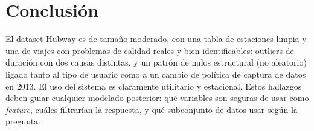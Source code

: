 \documentclass[11pt,a4paper]{article}
\begin{document}
\section*{Conclusión}

El dataset Hubway es de tamaño moderado, con una tabla de estaciones limpia y una de viajes con problemas
de calidad reales y bien identificables: outliers de duración con dos causas distintas, y un patrón de
nulos estructural (no aleatorio) ligado tanto al tipo de usuario como a un cambio de política de captura de
datos en 2013. El uso del sistema es claramente utilitario y estacional. Estos hallazgos deben guiar
cualquier modelado posterior: qué variables son seguras de usar como \textit{feature}, cuáles filtrarían la
respuesta, y qué subconjunto de datos usar según la pregunta.
\end{document}
